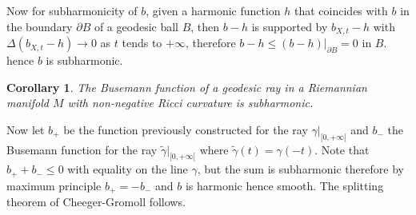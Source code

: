 \documentclass[11pt]{article}
\newtheorem{corollary}{Corollary}[theorem]
\begin{document}
Now for subharmonicity of \(b\), given a harmonic function \(h\) that coincides with \(b\) in the boundary \(\partial B\) of a
geodesic ball \(B\), then \(b-h\) is supported by \(b_{X,t} - h\) with \(\Delta (b_{X,t}-h) \to 0\) as \(t\)
tends to \(+\infty\), therefore \(b-h \leq (b-h)|_{\partial B} = 0\) in \(B\). hence \(b\) is subharmonic.

\begin{corollary}
The Busemann function of a geodesic ray in a Riemannian manifold \(M\) with non-negative Ricci
curvature is subharmonic.
\end{corollary}


Now let \(b_+\) be the function previously constructed for the ray \(\gamma|_{[0,+\infty[}\) and \(b_-\)
the Busemann function for the ray \(\tilde\gamma|_{[0,+\infty[}\) where \(\tilde\gamma(t) =
\gamma(-t)\). Note that \(b_+ + b_-\leq 0\) with equality on the line \(\gamma\), but the sum is
subharmonic therefore by maximum principle \(b_+ = -b_-\) and \(b\) is harmonic hence smooth. The
splitting theorem of Cheeger-Gromoll follows.
\end{document}
